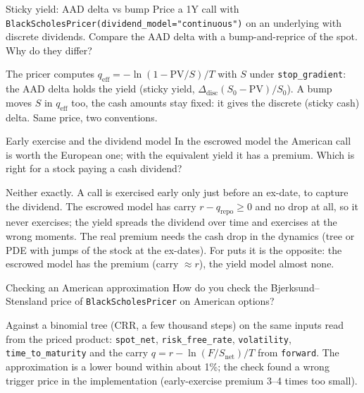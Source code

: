 \begin{question}{\Practice {}}{Sticky yield: AAD delta vs bump}
Price a 1Y call with \texttt{BlackScholesPricer(dividend\_model="continuous")} on an underlying with discrete
dividends. Compare the AAD delta with a bump-and-reprice of the spot. Why do they differ?
\end{question}
\begin{answer}
The pricer computes $q_{\text{eff}} = -\ln(1 - \mathrm{PV}/S)/T$ with $S$ under \texttt{stop\_gradient}: the AAD delta
holds the yield (sticky yield, $\Delta_{\text{disc}}(S_0-\mathrm{PV})/S_0$). A bump moves $S$ in $q_{\text{eff}}$ too, the
cash amounts stay fixed: it gives the discrete (sticky cash) delta. Same price, two conventions.
\end{answer}

\begin{question}{\Theory {}}{Early exercise and the dividend model}
In the escrowed model the American call is worth the European one; with the equivalent yield it has a premium. Which
is right for a stock paying a cash dividend?
\end{question}
\begin{answer}
Neither exactly. A call is exercised early only just before an ex-date, to capture the dividend. The escrowed model
has carry $r - q_{\text{repo}} \ge 0$ and no drop at all, so it never exercises; the yield spreads the dividend over
time and exercises at the wrong moments. The real premium needs the cash drop in the dynamics (tree or PDE with jumps
of the stock at the ex-dates). For puts it is the opposite: the escrowed model has the premium (carry $\approx r$), the
yield model almost none.
\end{answer}

\begin{question}{\Practice {}}{Checking an American approximation}
How do you check the Bjerksund--Stensland price of \texttt{BlackScholesPricer} on American options?
\end{question}
\begin{answer}
Against a binomial tree (CRR, a few thousand steps) on the same inputs read from the priced product:
\texttt{spot\_net}, \texttt{risk\_free\_rate}, \texttt{volatility}, \texttt{time\_to\_maturity} and the carry
$q = r - \ln(F/S_{\text{net}})/T$ from \texttt{forward}. The approximation is a lower bound within about 1\%; the
check found a wrong trigger price in the implementation (early-exercise premium 3--4 times too small).
\end{answer}

